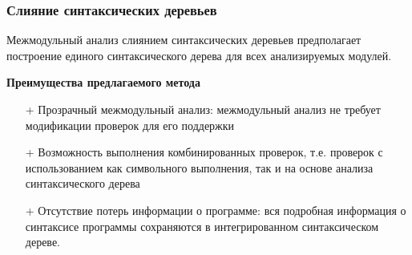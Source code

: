 \documentclass[hyperref={pdfpagelabels=false},10pt,gray]{beamer}
\begin{document}
\begin{frame}
\frametitle{Слияние синтаксических деревьев}
Межмодульный анализ слиянием синтаксических деревьев предполагает построение единого синтаксического дерева для всех анализируемых модулей.
\vspace{10pt}

\textbf{Преимущества предлагаемого метода}
\begin{itemize}
 \item[+] Прозрачный межмодульный анализ: межмодульный анализ не требует модификации проверок для его поддержки
 \item[+] Возможность выполнения комбинированных проверок, т.е. проверок с использованием как символьного выполнения, так и на основе анализа синтаксического дерева
 \item[+] Отсутствие потерь информации о программе: вся подробная информация о синтаксисе программы сохраняются в интегрированном синтаксическом дереве.
\end{itemize}
\end{frame}

\end{document}
